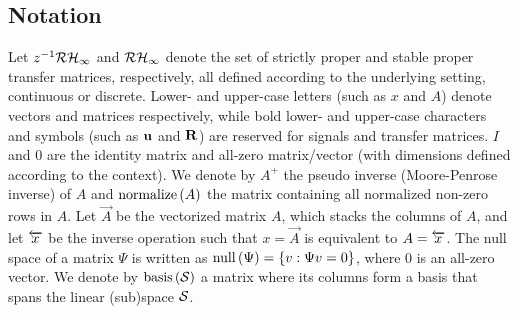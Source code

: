 \subsection{Notation} 

\def\Rp{\Rcal_{p}}
\def\Rsp{\Rcal_{sp}}
\def\RHinf{\Rcal\Hcal_{\infty}}

Let $z^{-1}\RHinf$ 
and $\RHinf$ denote the set of strictly proper 
and stable proper transfer matrices, respectively, all defined according to the underlying setting, continuous or discrete.
Lower- and upper-case letters (such as $x$ and $A$) denote vectors and matrices respectively, while bold lower- and upper-case characters and symbols (such as $\ubf$ and ${\bf R}$) are reserved for signals and transfer matrices. $I$ and $0$ are the identity matrix and all-zero matrix/vector (with dimensions defined according to the context).
We denote by $A^+$ the pseudo inverse (Moore-Penrose inverse) of $A$ and $\text{\rm normalize}\left(A\right)$ the matrix containing all normalized non-zero rows in $A$. Let $\vec{A}$ be the vectorized matrix $A$, which stacks the columns of $A$, and let $\overleftarrow{x}$ be the inverse operation such that $x = \vec{A}$ is equivalent to $A = \overleftarrow{x}$. The null space of a matrix $\Psi$ is written as $\nul{\Psi} = \{v : \Psi v = 0\}$, where $0$ is an all-zero vector. We denote by $\text{\rm basis}\left(\mathcal{S}\right)$ a matrix where its columns form a basis that spans the linear (sub)space $\mathcal{S}$.



\iffalse
We use lower- and upper-case letters (such as $x$ and $A$) to denote vectors and matrices respectively, while bold lower- and upper-case characters and symbols (such as $\ubf$ and ${\Phibf_\ubf}$) are reserved for signals and transfer matrices. Let $A^{ij}$ be the entry of $A$ at the $i^{\rm th}$ row and $j^{\rm th}$ column. We denote by $A^+$ the pseudo inverse (Moore-Penrose inverse).
We vectorize a matrix $A$ to be the vector $\v{A}$ by stacking its columns. Inversely, we rebuild the matrix $\vinv{x}$ from a vector $x$ by realigning the elements. The null space of a matrix $\Psi$ is written as $\nul{\Psi} = \{v : \Psi v = 0\}$, where $0$ is an all-zero vector. We slightly abuse the notation to write $A \in \nul{\Psi}$ if all columns in $A$ are in $\nul{\Psi}$.
Let $\left\lVert {\Phibf}_\ubf\right\rVert_{\Hcal_2}^2$ be the $\Hcal_2$ norm of a transfer function $\Phibf_\ubf$, which is given by $\sum_{t=0}^{\infty}\left\lVert{\Phi_u[t]}\right\rVert_{F}^2$ with $\lVert \cdot \rVert_{F}$ the Frobenius norm.
\fi